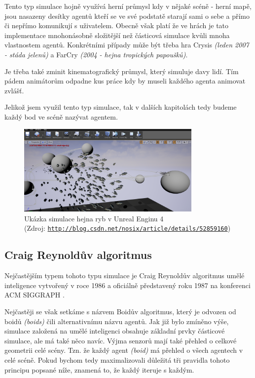 \documentclass[czech,public,dept460,male,cpdeclaration]{diploma}
\begin{document}
Tento typ simulace hojně využívá herní průmysl kdy v nějaké scéně - herní mapě, jsou nasazeny desítky agentů kteří se ve své podstatě starají sami o sebe a přímo či nepřímo komunikují s uživatelem. Obecně však platí že ve hrách je tato implementace mnohonásobně složitější než částicová simulace kvůli mnoha vlastnostem agentů. Konkrétními případy může být třeba hra Crysis \textit{(leden 2007 - stáda jelenů)} a FarCry \textit{(2004 - hejna tropických papoušků)}.

Je třeba také zminit kinematografický průmysl, který simuluje davy lidí. Tím pádem animátorům odpadne kus práce kdy by museli každého agenta animovat zvlášť.

Jelikož jsem využil tento typ simulace, tak v dalších kapitolách tedy budeme každý bod ve scéně nazývat agentem.

\begin{figure}\centering\includegraphics[width=0.8\textwidth]{Figures/flock_fish.png}
	\caption{
		Ukázka simulace hejna ryb v Unreal Enginu 4\\\hspace{\textwidth}(Zdroj: 
		\href{http://blog.csdn.net/nosix/article/details/52859160}{\texttt{http://blog.csdn.net/nosix/article/details/52859160}})
	}
\end{figure}

\subsection{Craig Reynoldův algoritmus}

Nejčastějším typem tohoto typu simulace je Craig Reynoldův algoritmus umělé inteligence vytvořený v roce 1986 a oficiálně představený roku 1987 na konferenci ACM SIGGRAPH \cite{linkToACM, linkToSIGGRAPH}.

Nejčastěji se však setkáme s názvem Boidův algoritmus, který je odvozen od boidů \textit{(boids)} čili alternativnímu názvu agentů. Jak již bylo zmíněno výše, simulace založená na
umělé inteligenci obsahuje základní prvky částicové simulace, ale má také něco navíc. Výjma senzorů mají také přehled o celkové geometrii celé scény. Tzn. že každý agent \textit{(boid)} má přehled o všech agentech v celé scéně. Pokud bychom tedy maximalizovali důležitá tři pravidla tohoto principu popsané níže, znamená to, že každý iteruje \cite{linkToIteration} s každým.
\end{document}
